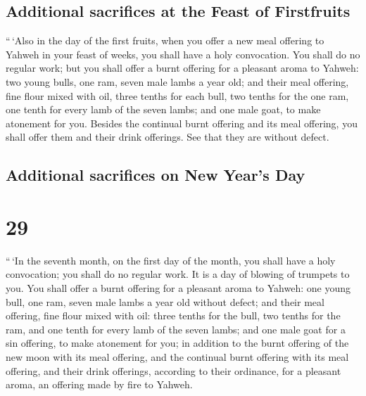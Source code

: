 \hypertarget{additional-sacrifices-at-the-feast-of-firstfruits}{%
\subsection{Additional sacrifices at the Feast of
Firstfruits}\label{additional-sacrifices-at-the-feast-of-firstfruits}}

 ``\,`Also in the day of the first fruits, when you offer
a new meal offering to Yahweh in your feast of weeks, you shall have a
holy convocation. You shall do no regular work;  but you
shall offer a burnt offering for a pleasant aroma to Yahweh: two young
bulls, one ram, seven male lambs a year old;  and their
meal offering, fine flour mixed with oil, three tenths for each bull,
two tenths for the one ram,  one tenth for every lamb of
the seven lambs;  and one male goat, to make atonement
for you.  Besides the continual burnt offering and its
meal offering, you shall offer them and their drink offerings. See that
they are without defect.

\hypertarget{additional-sacrifices-on-new-years-day}{%
\subsection{Additional sacrifices on New Year's
Day}\label{additional-sacrifices-on-new-years-day}}

\hypertarget{section-28}{%
\section{29}\label{section-28}}

 ``\,`In the seventh month, on the first day of the month,
you shall have a holy convocation; you shall do no regular work. It is a
day of blowing of trumpets to you.  You shall offer a
burnt offering for a pleasant aroma to Yahweh: one young bull, one ram,
seven male lambs a year old without defect;  and their
meal offering, fine flour mixed with oil: three tenths for the bull, two
tenths for the ram,  and one tenth for every lamb of the
seven lambs;  and one male goat for a sin offering, to
make atonement for you;  in addition to the burnt offering
of the new moon with its meal offering, and the continual burnt offering
with its meal offering, and their drink offerings, according to their
ordinance, for a pleasant aroma, an offering made by fire to Yahweh.

